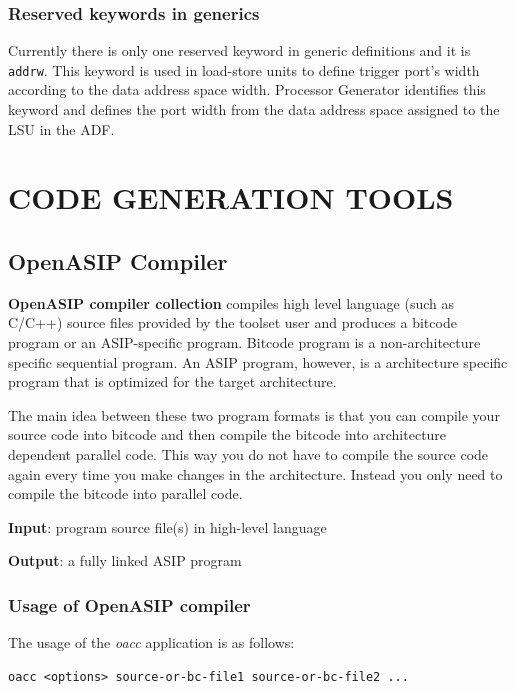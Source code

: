 \documentclass[a4paper,twoside]{tceusermanual}
\begin{document}
\subsection{Reserved keywords in generics}

Currently there is only one reserved keyword in generic definitions and it is
\verb|addrw|. This keyword is used in load-store units to define trigger
port's width according to the data address space width. Processor Generator
identifies this keyword and defines the port width from the data address space
assigned to the LSU in the ADF.


\chapter{CODE GENERATION TOOLS}

\section{OpenASIP Compiler}
\label{sec:frontend}

\textbf{OpenASIP compiler collection} compiles high level language (such as
C/C++) source files provided by the toolset user and produces a bitcode
program or an ASIP-specific program. Bitcode program is a non-architecture
specific sequential program. An ASIP program, however, is
a architecture specific program that is optimized for the target architecture.

The main idea between these two program formats is that you can compile your
source code into bitcode and then compile the bitcode into architecture
dependent parallel code. This way you do not have to compile the source code
again every time you make changes in the architecture. Instead you only need
to compile the bitcode into parallel code.

\textbf{Input}: program source file(s) in high-level language

\textbf{Output}: a fully linked ASIP program

\subsection{Usage of OpenASIP compiler}

The usage of the \emph{oacc} application is as follows:

\begin{verbatim}
oacc <options> source-or-bc-file1 source-or-bc-file2 ...
\end{verbatim}
\end{document}
